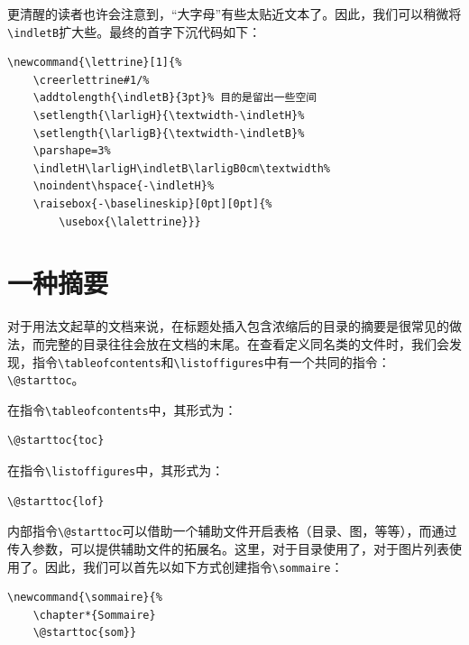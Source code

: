 更清醒的读者也许会注意到，“大字母”有些太贴近文本了。因此，我们可以稍微将\verb|\indletB|扩大些。最终的首字下沉代码如下：

\begin{dmd}
\begin{verbatim}
\newcommand{\lettrine}[1]{%
    \creerlettrine#1/%
    \addtolength{\indletB}{3pt}% 目的是留出一些空间
    \setlength{\larligH}{\textwidth-\indletH}% 
    \setlength{\larligB}{\textwidth-\indletB}% 
    \parshape=3% 
    \indletH\larligH\indletB\larligB0cm\textwidth% 
    \noindent\hspace{-\indletH}% 
    \raisebox{-\baselineskip}[0pt][0pt]{%
        \usebox{\lalettrine}}}\end{verbatim}
\end{dmd}

\section{一种摘要}

对于用法文起草的文档来说，在标题处插入包含浓缩后的目录的摘要是很常见的做法，而完整的目录往往会放在文档的末尾。在查看定义同名类的文件时，我们会发现，指令\verb|\tableofcontents|和\verb|\listoffigures|中有一个共同的指令：\verb|\@starttoc|。

在指令\verb|\tableofcontents|中，其形式为：

\begin{dmd}
\begin{verbatim}
\@starttoc{toc}\end{verbatim}
\end{dmd}

在指令\verb|\listoffigures|中，其形式为：

\begin{dmd}
\begin{verbatim}
\@starttoc{lof}\end{verbatim}
\end{dmd}

内部指令\verb|\@starttoc|可以借助一个辅助文件开启表格（目录、图，等等），而通过传入参数，可以提供辅助文件的拓展名。这里，对于目录使用了，对于图片列表使用了。因此，我们可以首先以如下方式创建指令\verb|\sommaire|：

\begin{dmd}
\begin{verbatim}
\newcommand{\sommaire}{% 
    \chapter*{Sommaire} 
    \@starttoc{som}}\end{verbatim}
\end{dmd}


